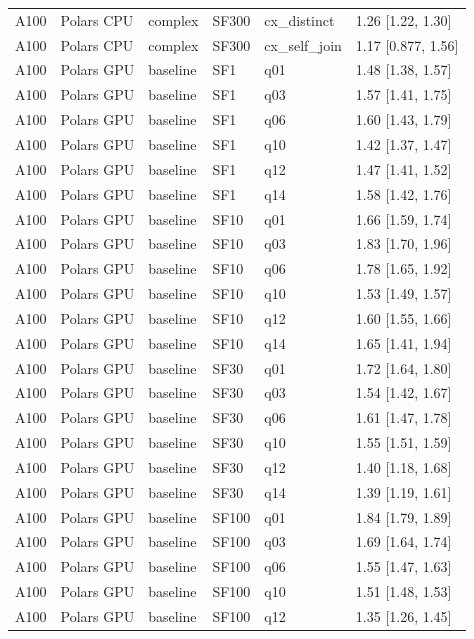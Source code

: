 \begin{longtable}{llllll}
A100 & Polars CPU & complex & SF300 & cx\_distinct & 1.26 [1.22, 1.30] \\
A100 & Polars CPU & complex & SF300 & cx\_self\_join & 1.17 [0.877, 1.56] \\
A100 & Polars GPU & baseline & SF1 & q01 & 1.48 [1.38, 1.57] \\
A100 & Polars GPU & baseline & SF1 & q03 & 1.57 [1.41, 1.75] \\
A100 & Polars GPU & baseline & SF1 & q06 & 1.60 [1.43, 1.79] \\
A100 & Polars GPU & baseline & SF1 & q10 & 1.42 [1.37, 1.47] \\
A100 & Polars GPU & baseline & SF1 & q12 & 1.47 [1.41, 1.52] \\
A100 & Polars GPU & baseline & SF1 & q14 & 1.58 [1.42, 1.76] \\
A100 & Polars GPU & baseline & SF10 & q01 & 1.66 [1.59, 1.74] \\
A100 & Polars GPU & baseline & SF10 & q03 & 1.83 [1.70, 1.96] \\
A100 & Polars GPU & baseline & SF10 & q06 & 1.78 [1.65, 1.92] \\
A100 & Polars GPU & baseline & SF10 & q10 & 1.53 [1.49, 1.57] \\
A100 & Polars GPU & baseline & SF10 & q12 & 1.60 [1.55, 1.66] \\
A100 & Polars GPU & baseline & SF10 & q14 & 1.65 [1.41, 1.94] \\
A100 & Polars GPU & baseline & SF30 & q01 & 1.72 [1.64, 1.80] \\
A100 & Polars GPU & baseline & SF30 & q03 & 1.54 [1.42, 1.67] \\
A100 & Polars GPU & baseline & SF30 & q06 & 1.61 [1.47, 1.78] \\
A100 & Polars GPU & baseline & SF30 & q10 & 1.55 [1.51, 1.59] \\
A100 & Polars GPU & baseline & SF30 & q12 & 1.40 [1.18, 1.68] \\
A100 & Polars GPU & baseline & SF30 & q14 & 1.39 [1.19, 1.61] \\
A100 & Polars GPU & baseline & SF100 & q01 & 1.84 [1.79, 1.89] \\
A100 & Polars GPU & baseline & SF100 & q03 & 1.69 [1.64, 1.74] \\
A100 & Polars GPU & baseline & SF100 & q06 & 1.55 [1.47, 1.63] \\
A100 & Polars GPU & baseline & SF100 & q10 & 1.51 [1.48, 1.53] \\
A100 & Polars GPU & baseline & SF100 & q12 & 1.35 [1.26, 1.45] \\

\end{longtable}
